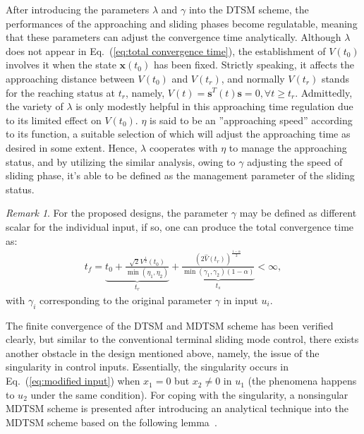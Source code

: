 \documentclass[3p]{elsarticle}
\theoremstyle{plain}
\theoremstyle{remark}
\newtheorem{myrem}{Remark}
\begin{document}
After introducing the parameters $\lambda$ and $\gamma$ into the DTSM scheme, the performances of the approaching and sliding phases become regulatable, meaning that these parameters can adjust the convergence time analytically. Although $\lambda$ does not appear in Eq.~(\ref{eq:total convergence time}), the establishment of $V(t_0)$ involves it when the state $\bm x(t_0)$ has been fixed. Strictly speaking, it affects the approaching distance between $V(t_0)$ and $V(t_r)$, and normally $V(t_r)$ stands for the reaching status at $t_r$, namely, $V(t)=\bm s^T(t)\bm s = 0,\forall t\ge t_r$. Admittedly, the variety of $\lambda$ is only modestly helpful in this approaching time regulation due to its limited effect on $V(t_0)$. $\eta$ is said to be an ''approaching speed'' according to its function, a suitable selection of which will adjust the approaching time as desired in some extent. Hence, $\lambda$ cooperates with $\eta$ to manage the approaching status, and by utilizing the similar analysis, owing to $\gamma$ adjusting the speed of sliding phase, it's able to be defined as the management parameter of the sliding status.
\begin{myrem}
For the proposed designs, the parameter $\gamma$ may be defined as different scalar for the individual input, if so, one can produce the total convergence time as:
\begin{align}
t_f = \underbrace{t_0+\frac{\sqrt{2}V^{\frac{1}{2}}(t_0)}{\min(\eta_1,\eta_2)}}_{t_r}+\underbrace{\frac{(2\hat V(t_r))^{\frac{1-\alpha}{2}}}{\min(\gamma_1,\gamma_2)(1-\alpha)}}_{t_s}<\infty,\label{eq:normal total convergence time}
\end{align}
with $\gamma_i$ corresponding to the original parameter $\gamma$ in input $u_i$.
\end{myrem}
The finite convergence of the DTSM and MDTSM scheme has been verified clearly, but similar to the conventional terminal sliding mode control, there exists another obstacle in the design mentioned above, namely, the issue of the singularity in control inputs. Essentially, the singularity occurs in Eq.~(\ref{eq:modified input}) when $x_1=0$ but $x_2\neq 0$ in $u_1$ (the phenomena happens to $u_2$ under the same condition). For coping with the singularity, a nonsingular MDTSM scheme is presented after introducing an analytical technique into the MDTSM scheme based on the following lemma~\cite{feng2013nonsingular}.
\end{document}
